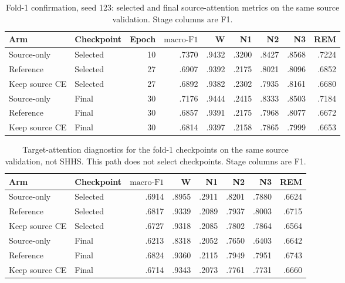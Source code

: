 \documentclass[10pt,a4paper]{article}
\newcommand{\mf}{\ensuremath{\mathrm{macro\text{-}F1}}}
\begin{document}
\begin{table}[H]
\centering\small
\caption{Fold-1 confirmation, seed 123: selected and final source-attention metrics
on the same source validation. Stage columns are F1.}
\label{tab:sup_adast_confirmation}
\begin{tabular}{llrrrrrrr}
\toprule
Arm & Checkpoint & Epoch & \mf & W & N1 & N2 & N3 & REM \\
\midrule
Source-only & Selected & 10 & .7370 & .9432 & .3200 & .8427 & .8568 & .7224 \\
Reference & Selected & 27 & .6907 & .9392 & .2175 & .8021 & .8096 & .6852 \\
Keep source CE & Selected & 27 & .6892 & .9382 & .2302 & .7935 & .8161 & .6680 \\
\midrule
Source-only & Final & 30 & .7176 & .9444 & .2415 & .8333 & .8503 & .7184 \\
Reference & Final & 30 & .6857 & .9391 & .2175 & .7968 & .8077 & .6672 \\
Keep source CE & Final & 30 & .6814 & .9397 & .2158 & .7865 & .7999 & .6653 \\
\bottomrule
\end{tabular}
\end{table}

\begin{table}[H]
\centering\small
\caption{Target-attention diagnostics for the fold-1 checkpoints on the same source
validation, not SHHS. This path does not select checkpoints. Stage columns are F1.}
\label{tab:sup_adast_confirmation_attention}
\begin{tabular}{llrrrrrr}
\toprule
Arm & Checkpoint & \mf & W & N1 & N2 & N3 & REM \\
\midrule
Source-only & Selected & .6914 & .8955 & .2911 & .8201 & .7880 & .6624 \\
Reference & Selected & .6817 & .9339 & .2089 & .7937 & .8003 & .6715 \\
Keep source CE & Selected & .6727 & .9318 & .2085 & .7802 & .7864 & .6564 \\
\midrule
Source-only & Final & .6213 & .8318 & .2052 & .7650 & .6403 & .6642 \\
Reference & Final & .6824 & .9360 & .2115 & .7949 & .7951 & .6743 \\
Keep source CE & Final & .6714 & .9343 & .2073 & .7761 & .7731 & .6660 \\
\bottomrule
\end{tabular}
\end{table}
\end{document}
